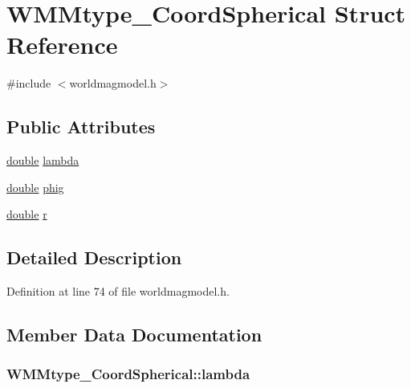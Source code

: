 \hypertarget{struct_w_m_mtype___coord_spherical}{\section{W\-M\-Mtype\-\_\-\-Coord\-Spherical Struct Reference}
\label{struct_w_m_mtype___coord_spherical}
}


{\ttfamily \#include $<$worldmagmodel.\-h$>$}

\subsection*{Public Attributes}
\begin{DoxyCompactItemize}
\item 
\hyperlink{_super_l_u_support_8h_a8956b2b9f49bf918deed98379d159ca7}{double} \hyperlink{struct_w_m_mtype___coord_spherical_a325e642d20cf8e2cf39cff24d86047aa}{lambda}
\item 
\hyperlink{_super_l_u_support_8h_a8956b2b9f49bf918deed98379d159ca7}{double} \hyperlink{struct_w_m_mtype___coord_spherical_a3c1dc1afddaf89194d67521dfe135585}{phig}
\item 
\hyperlink{_super_l_u_support_8h_a8956b2b9f49bf918deed98379d159ca7}{double} \hyperlink{struct_w_m_mtype___coord_spherical_a24681de24337609c5f3dc7a6346c6674}{r}
\end{DoxyCompactItemize}


\subsection{Detailed Description}


Definition at line 74 of file worldmagmodel.\-h.



\subsection{Member Data Documentation}
\hypertarget{struct_w_m_mtype___coord_spherical_a325e642d20cf8e2cf39cff24d86047aa}{
\subsubsection[{lambda}]{ W\-M\-Mtype\-\_\-\-Coord\-Spherical\-::lambda}}\label{struct_w_m_mtype___coord_spherical_a325e642d20cf8e2cf39cff24d86047aa}


